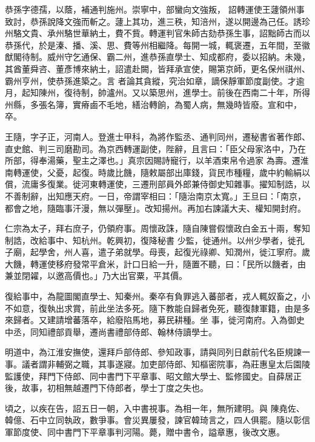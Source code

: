 \begin{pinyinscope}
 恭孫字德孺，以蔭，補通判施州。崇寧中，部蠻向文強叛，
 詔轉運使王蘧領州事致討，恭孫說降文強而斬之。蘧上其功，進三秩，知涪州，遂以開邊為己任。誘珍州駱文貴、承州駱世華納土，費不貲。轉運判官朱師古劾恭孫生事，詔黜師古而以恭孫代，於是溱、播、溪、思、費等州相繼降。每開一城，輒褒遷，五年間，至徽猷閣待制。威州守乞通保、霸二州，進恭孫直學士、知成都府，委以招納。未幾，其酋董舜咨、董彥博來納土，詔遣赴闕，皆拜承宣使，賜第京師，更名保州祺州、霸州亨州，使恭孫進築之。言
 者論其貪縱，究治如章，謫保靜軍節度副使。才逾月，起知陳州，復待制，帥瀘州。又以築思州，進學士。前後在西南二十年，所得州縣，多張名簿，實瘠鹵不毛地，繕治轉餉，為蜀人病，無幾時皆廢。宣和中，卒。



 王隨，字子正，河南人。登進士甲科，為將作監丞、通判同州，遷秘書省著作郎、直史館、判三司磨勘司。為京西轉運副使，陛辭，且言曰：「臣父母家洛中，乃在所部，得奉湯藥，聖主之澤也。」真宗因賜詩寵行，以羊酒束帛令過家
 為壽。遷淮南轉運使，父憂，起復。時歲比饑，隨敕屬部出庫錢，貨民市種糧，歲中約輸絹以償，流庸多復業。徙河東轉運使，三遷刑部員外郎兼侍御史知雜事。擢知制誥，以不善制辭，出知應天府。一日，帝謂宰相曰：「隨治南京太寬。」王旦曰：「南京，都會之地，隨臨事汗漫，無以彈壓」。改知揚州。再加右諫議大夫、權知開封府。



 仁宗為太子，拜右庶子，仍領府事。周懷政誅，隨自陳嘗假懷政白金五十兩，奪知制誥，改給事中、知杭州。乾興初，復降秘書
 少監，徙通州。以州少學者，徙孔子廟，起學舍，州人喜，遣子弟就學。母喪，起復光祿卿、知潤州，徙江寧府。歲大饑，轉運使移府發常平倉米，計口日給一升，隨置不聽，曰：「民所以饑者，由兼並閉糴，以邀高價也。」乃大出官粟，平其價。



 復給事中，為龍圖閣直學士、知秦州。秦卒有負罪逃入蕃部者，戎人輒奴畜之，小不如意，復執出求賞，前此坐法多死。隨下教能自歸者免死，聽復隸軍籍，由是多來歸者。又建請增蕃落卒，給廢陷馬地，募民耕種。坐
 事，徙河南府。入為御史中丞，同知禮部貢舉，遷尚書禮部侍郎、翰林侍讀學士。



 明道中，為江淮安撫使，還拜戶部侍郎、參知政事，請與同列日獻前代名臣規諫一事。議者謂非輔弼之職，其事遂寢。加吏部侍郎、知樞密院事，為莊惠皇太后園陵監護使，拜門下侍郎、同中書門下平章事、昭文館大學士、監修國史。自薛居正後，故事，初相無越遷門下侍郎者，學士丁度之失也。



 頃之，以疾在告，詔五日一朝，入中書視事。為相一年，無所建明。與
 陳堯佐、韓億、石中立同執政，數爭事。會災異屢發，諫官韓琦言之，四人俱罷。隨以彰信軍節度使、同中書門下平章事判河陽。薨，贈中書令，謚章惠，後改文惠。




\end{pinyinscope}
